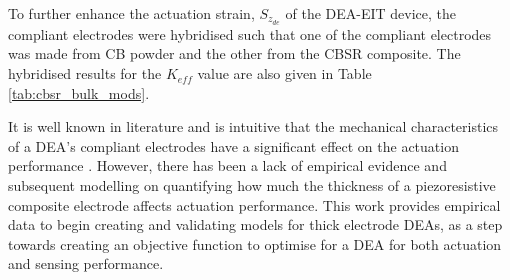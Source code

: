 	To further enhance the actuation strain, $S_{z_{de}}$ of the DEA-EIT device, the compliant electrodes were hybridised such that one of the compliant electrodes was made from CB powder and the other from the CBSR composite. The hybridised results for the $K_{e\!f\!f}$ value are also given in Table \ref{tab:cbsr_bulk_mods}.

 	It is well known in literature and is intuitive that the mechanical characteristics of a DEA's compliant electrodes have a significant effect on the actuation performance \cite{Carpi2003, Zhang2020} . However, there has been a lack of empirical evidence and subsequent modelling on quantifying how much the thickness of a piezoresistive composite electrode affects actuation performance. This work provides empirical data to begin creating and validating models for thick electrode DEAs, as a step towards creating an objective function to optimise for a DEA for both actuation and sensing performance. 
	
	
	
